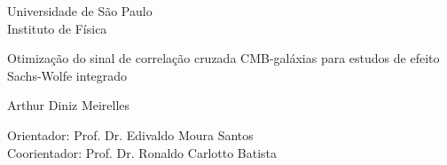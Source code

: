 \begin{titlepage}
\pagestyle{empty}
\begin{center}

	{\fontsize{16}{16} \selectfont Universidade de São Paulo \\}
	\vspace{0.1cm}
	{\fontsize{16}{16} \selectfont Instituto de Física}
    \vspace{3.3cm}

	{\fontsize{22}{22}\selectfont Otimização do sinal de correlação cruzada CMB-galáxias para estudos de efeito Sachs-Wolfe integrado \par}
    \vspace{2cm}


    {\fontsize{18}{18}\selectfont Arthur Diniz Meirelles \par}

    \vspace{2cm}

\end{center}

\leftskip 6cm
\begin{flushright}	
\leftskip 6cm
Orientador: Prof. Dr.  Edivaldo Moura Santos \\
\leftskip 6cm
Coorientador: Prof. Dr. Ronaldo Carlotto Batista
\end{flushright}	

    \vspace{0.8cm}    


\par
\leftskip 6cm
\par
\leftskip 0cm
\vskip 1.5cm


\end{titlepage}
